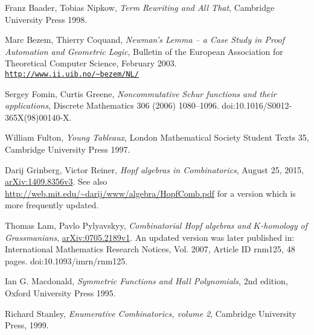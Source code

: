 \documentclass[numbers=enddot,12pt,final,onecolumn,notitlepage]{scrartcl}%
\theoremstyle{definition}
\begin{document}
\begin{thebibliography}{99999999}                                                                                         %


Franz Baader, Tobias Nipkow, \textit{Term
Rewriting and All That}, Cambridge University Press 1998.

Marc Bezem, Thierry Coquand, \textit{Newman's Lemma
-- a Case Study in Proof Automation and Geometric Logic}, Bulletin of the
European Association for Theoretical Computer Science, February 2003.\newline%
\texttt{\url{http://www.ii.uib.no/~bezem/NL/}}

Sergey Fomin, Curtis Greene, \textit{Noncommutative
Schur functions and their applications}, Discrete Mathematics 306 (2006) 1080--1096.
doi:10.1016/S0012-365X(98)00140-X.

William Fulton, \textit{Young Tableaux}, London
Mathematical Society Student Texts 35, Cambridge University Press 1997.

Darij Grinberg, Victor Reiner, \textit{Hopf
algebras in Combinatorics}, August 25, 2015,
\href{http://arxiv.org/abs/1409.8356v3}{arXiv:1409.8356v3}. \newline See also
\url{http://web.mit.edu/~darij/www/algebra/HopfComb.pdf} for a version which
is more frequently updated.

Thomas Lam, Pavlo Pylyavskyy, \textit{Combinatorial
Hopf algebras and }$K$\textit{-homology of Grassmanians},
\href{http://arxiv.org/abs/0705.2189v1}{arXiv:0705.2189v1}. An updated version
was later published in: International Mathematics Research Notices, Vol. 2007,
Article ID rnm125, 48 pages. doi:10.1093/imrn/rnm125.

Ian G. Macdonald, \textit{Symmetric Functions and
Hall Polynomials}, 2nd edition, Oxford University Press 1995.

Richard Stanley, \textit{Enumerative Combinatorics,
volume 2}, Cambridge University Press, 1999.
\end{thebibliography}
\end{document}
